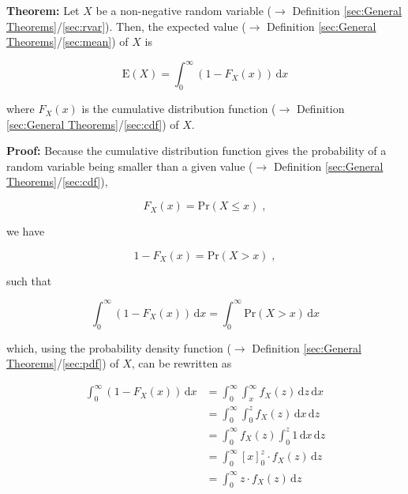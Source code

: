 \documentclass[a4paper,12pt,twoside]{book}
\begin{document}
\textbf{Theorem:} Let $X$ be a non-negative random variable ($\rightarrow$ Definition \ref{sec:General Theorems}/\ref{sec:rvar}). Then, the expected value ($\rightarrow$ Definition \ref{sec:General Theorems}/\ref{sec:mean}) of $X$ is

\begin{equation} \label{eq:mean-nnrvar-mean-cdf}
\mathrm{E}(X) = \int_{0}^{\infty} (1 - F_X(x)) \, \mathrm{d}x
\end{equation}

where $F_X(x)$ is the cumulative distribution function ($\rightarrow$ Definition \ref{sec:General Theorems}/\ref{sec:cdf}) of $X$.


\vspace{1em}
\textbf{Proof:} Because the cumulative distribution function gives the probability of a random variable being smaller than a given value ($\rightarrow$ Definition \ref{sec:General Theorems}/\ref{sec:cdf}),

\begin{equation} \label{eq:mean-nnrvar-cdf-Pr-leq}
F_X(x) = \mathrm{Pr}(X \leq x) \; ,
\end{equation}

we have

\begin{equation} \label{eq:mean-nnrvar-cdf-Pr-geq}
1 - F_X(x) = \mathrm{Pr}(X > x) \; ,
\end{equation}

such that

\begin{equation} \label{eq:mean-nnrvar-mean-cdf-s1}
\int_{0}^{\infty} (1 - F_X(x)) \, \mathrm{d}x = \int_{0}^{\infty} \mathrm{Pr}(X > x) \, \mathrm{d}x
\end{equation}

which, using the probability density function ($\rightarrow$ Definition \ref{sec:General Theorems}/\ref{sec:pdf}) of $X$, can be rewritten as

\begin{equation} \label{eq:mean-nnrvar-mean-cdf-s2}
\begin{split}
\int_{0}^{\infty} (1 - F_X(x)) \, \mathrm{d}x &= \int_{0}^{\infty} \int_{x}^{\infty} f_X(z) \, \mathrm{d}z \, \mathrm{d}x \\
&= \int_{0}^{\infty} \int_{0}^{z} f_X(z) \, \mathrm{d}x \, \mathrm{d}z \\
&= \int_{0}^{\infty} f_X(z) \int_{0}^{z} 1 \, \mathrm{d}x \, \mathrm{d}z \\
&= \int_{0}^{\infty} [x]_{0}^{z} \cdot f_X(z) \, \mathrm{d}z \\
&= \int_{0}^{\infty} z \cdot f_X(z) \, \mathrm{d}z \\
\end{split}
\end{equation}
\end{document}
